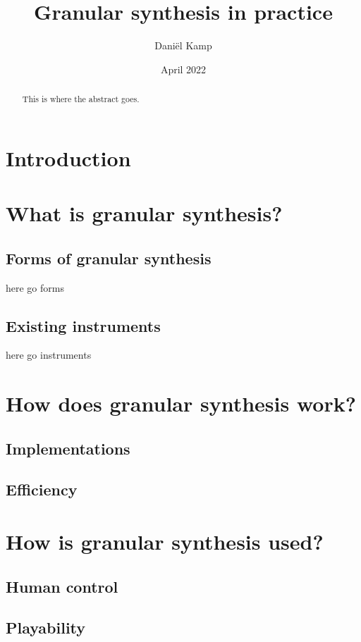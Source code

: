 \documentclass[12pt, letterpaper]{article}
\title{Granular synthesis in practice}
\author{Daniël Kamp}
\date{April 2022}
\begin{document}
\maketitle

\begin{abstract}
This is where the abstract goes.
\end{abstract}

\section*{Introduction}

\section{What is granular synthesis?}
\subsection{Forms of granular synthesis}
here go forms
\subsection{Existing instruments}
here go instruments

\section{How does granular synthesis work?}
\subsection{Implementations}
\subsection{Efficiency}

\section{How is granular synthesis used?}
\subsection{Human control}
\subsection{Playability}
\end{document}

